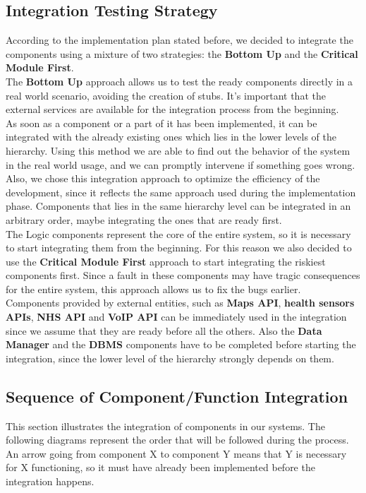 \clearpage
\subsection{Integration Testing Strategy}
According to the implementation plan stated before, we decided to integrate the components using a mixture of two strategies: the \textbf{Bottom Up} and the \textbf{Critical Module First}.\\
The \textbf{Bottom Up} approach allows us to test the ready components directly in a real world scenario, avoiding the creation of stubs. It's important that the external services are available for the integration process from the beginning.\\
As soon as a component or a part of it has been implemented, it can be integrated with the already existing ones which lies in the lower levels of the hierarchy. Using this method we are able to find out the behavior of the system in the real world usage, and we can promptly intervene if something goes wrong.\\
Also, we chose this integration approach to optimize the efficiency of the development, since it reflects the same approach used during the implementation phase.
Components that lies in the same hierarchy level can be integrated in an arbitrary order, maybe integrating the ones that are ready first.\\
The Logic components represent the core of the entire system, so it is necessary to start integrating them from the beginning.
For this reason we also decided to use the \textbf{Critical Module First} approach to start integrating the riskiest components first.
Since a fault in these components may have tragic consequences for the entire system, this approach allows us to fix the bugs earlier.\\
Components provided by external entities, such as \textbf{Maps API}, \textbf{health sensors APIs}, \textbf{NHS API} and \textbf{VoIP API} can be immediately used in the integration since we assume that they are ready before all the others. Also the \textbf{Data Manager} and the \textbf{DBMS} components have to be completed before starting the integration, since the lower level of the hierarchy strongly depends on them.\\
\subsection{Sequence of Component/Function Integration}
This section illustrates the integration of components in our systems. The following diagrams represent the order that will be followed during the process. An arrow going from component X to component Y means that Y is necessary for X functioning, so it must have already been implemented before the integration happens.

